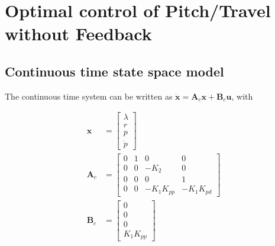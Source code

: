 


\section{Optimal control of Pitch/Travel without Feedback}

\subsection{Continuous time state space model}

The continuous time system can be written as $\mathbf{\dot{x}} = \mathbf{A}_c\mathbf{x}+ \mathbf{B}_c\mathbf{u}$, with

\begin{subequations}

    \begin{align}

        \mathbf{x} &= \begin{bmatrix}

            \lambda\\

            r\\

            p\\

            \dot{p}

        \end{bmatrix}\\

        \mathbf{A}_c &= \begin{bmatrix}

            0 & 1 & 0 & 0\\

            0 & 0 & -K_2 & 0\\

            0 & 0 & 0 & 1\\

            0 & 0& -K_1K_{pp} & -K_1K_{pd}

        \end{bmatrix} \\

        \mathbf{B}_c &= \begin{bmatrix}

            0\\

            0\\

            0\\

            K_1K_{pp}

        \end{bmatrix}

    \end{align}

\end{subequations}



